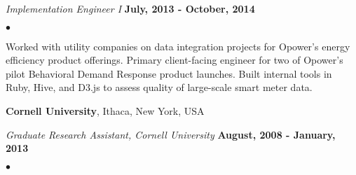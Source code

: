 \documentclass[margin,line]{res}
\newenvironment{list2}{
  \begin{list}{$\bullet$}{%
      \setlength{\itemsep}{0in}
      \setlength{\parsep}{0in} \setlength{\parskip}{0in}
      \setlength{\topsep}{0in} \setlength{\partopsep}{0in}
      \setlength{\leftmargin}{0.2in}}}{\end{list}}
\begin{document}
\begin{resume}
\vspace{-.3cm}
{\em Implementation Engineer I} \hfill {\bf July, 2013 - October, 2014}\\
\vspace*{-5mm}
\vspace*{2mm}
\begin{list2}
\item Worked with utility companies on data integration projects for
  Opower's energy efficiency product offerings.  Primary client-facing
  engineer for two of Opower's pilot Behavioral Demand Response
  product launches. Built internal tools in Ruby, Hive, and D3.js to
  assess quality of large-scale smart meter data.
\end{list2}

{\bf Cornell University}, Ithaca, New York, USA

\vspace{-.3cm}
{\em Graduate Research Assistant, Cornell University} \hfill {\bf August, 2008 - January, 2013}\\

\vspace*{-5mm}
\vspace*{2mm}
\begin{list2}



\end{list2}
\end{resume}
\end{document}
